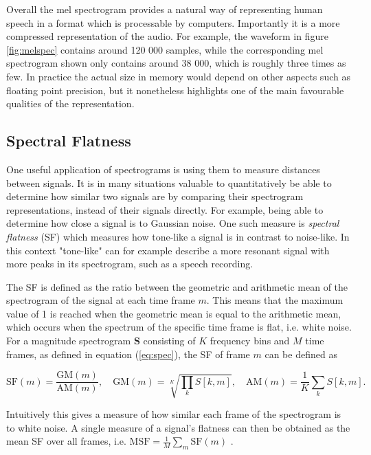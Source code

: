 \documentclass{report}
\begin{document}
Overall the mel spectrogram provides a natural way of representing human speech in a format which is processable by computers. Importantly it is a more compressed representation of the audio. For example, the waveform in figure \ref{fig:melspec} contains around 120 000 samples, while the corresponding mel spectrogram shown only contains around 38 000, which is roughly three times as few. In practice the actual size in memory would depend on other aspects such as floating point precision, but it nonetheless highlights one of the main favourable qualities of the representation.

\subsection{Spectral Flatness} \label{sec:msf}
One useful application of spectrograms is using them to measure distances between signals. It is in many situations valuable to quantitatively be able to determine how similar two signals are by comparing their spectrogram representations, instead of their signals directly. For example, being able to determine how close a signal is to Gaussian noise. One such measure is \textit{spectral flatness} (SF) which measures how tone-like a signal is in contrast to noise-like. In this context "tone-like" can for example describe a more resonant signal with more peaks in its spectrogram, such as a speech recording.

The SF is defined as the ratio between the geometric and arithmetic mean of the spectrogram of the signal at each time frame $m$. This means that the maximum value of 1 is reached when the geometric mean is equal to the arithmetic mean, which occurs when the spectrum of the specific time frame is flat, i.e. white noise. For a magnitude spectrogram $\bm{S}$ consisting of $K$ frequency bins and $M$ time frames, as defined in equation (\ref{eq:spec}), the SF of frame $m$ can be defined as

\begin{equation}
    \text{SF}(m) = \frac{\text{GM}(m)}{\text{AM}(m)}, \quad \text{GM}(m) = \sqrt[K]{\prod_{k} S[k, m]}, \quad \text{AM}(m) = \frac{1}{K} \sum_k S[k, m].
\end{equation}

Intuitively this gives a measure of how similar each frame of the spectrogram is to white noise. A single measure of a signal's flatness can then be obtained as the mean SF over all frames, i.e. $\text{MSF} = \frac{1}{M} \sum_m \text{SF}(m)$ \cite{ma2013efficient, dubnov2004generalization}.
\end{document}
